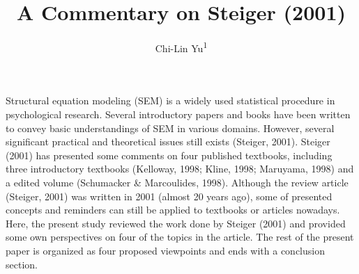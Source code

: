 \documentclass[jou]{apa6}
\title{A Commentary on Steiger (2001)}
\author{Chi-Lin Yu\textsuperscript{1}}
\affiliation{
    \vspace{0.5cm}
          \textsuperscript{1} Department of Psychology, National Taiwan University  }
\theoremstyle{definition}
\theoremstyle{definition}
\theoremstyle{definition}
\theoremstyle{remark}
\begin{document}
\maketitle

\setcounter{secnumdepth}{0}



\setlength{\parindent}{4ex}

Structural equation modeling (SEM) is a widely used statistical
procedure in psychological research. Several introductory papers and
books have been written to convey basic understandings of SEM in various
domains. However, several significant practical and theoretical issues
still exists (Steiger, 2001). Steiger (2001) has presented some comments
on four published textbooks, including three introductory textbooks
(Kelloway, 1998; Kline, 1998; Maruyama, 1998) and a edited volume
(Schumacker \& Marcoulides, 1998). Although the review article (Steiger,
2001) was written in 2001 (almost 20 years ago), some of presented
concepts and reminders can still be applied to textbooks or articles
nowadays. Here, the present study reviewed the work done by Steiger
(2001) and provided some own perspectives on four of the topics in the
article. The rest of the present paper is organized as four proposed
viewpoints and ends with a conclusion section.
\end{document}
